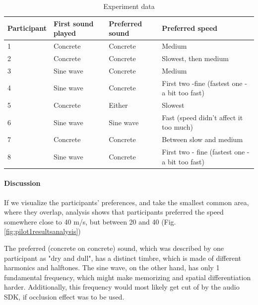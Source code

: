 \begin{table}[h]
	\label{table:pilot1_results}
	\caption{Experiment data}
	
	\begin{tabular}{|l|l|l|l|}
		\hline
		\textbf{Participant} & \textbf{First sound played} & \textbf{Preferred sound} & \textbf{Preferred speed}                        \\ \hline
		1                    & Concrete                    & Concrete                 & Medium                                          \\ \hline
		2                    & Concrete                    & Concrete                 & Slowest, then medium                            \\ \hline
		3                    & Sine wave                   & Concrete                 & Medium                                          \\ \hline
		4                    & Sine wave                   & Concrete                 & First two -fine (fastest one - a bit too fast)  \\ \hline
		5                    & Concrete                    & Either                   & Slowest                                         \\ \hline
		6                    & Sine wave                   & Sine wave                & Fast (speed didn't affect it too much)          \\ \hline
		7                    & Concrete                    & Concrete                 & Between slow and medium                         \\ \hline
		8                    & Sine wave                   & Concrete                 & First two - fine (fastest one - a bit too fast) \\ \hline
	\end{tabular}
\end{table}

\paragraph{Discussion}
If we visualize the participants' preferences, and take the smallest common area, where they overlap, analysis shows that participants preferred the speed somewhere close to 40 m/s, but between 20 and 40 (Fig. \ref{fig:pilot1resultsanalysis})

The preferred (concrete on concrete) sound, which was described by one participant as "dry and dull", has a distinct timbre, which is made of different harmonics and halftones. The sine wave, on the other hand, has only 1 fundamental frequency, which might make memorizing and spatial differentiation harder. Additionally, this frequency would most likely get cut of by the audio SDK, if occlusion effect was to be used.

